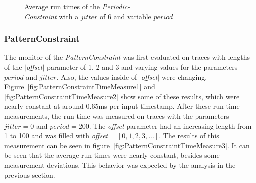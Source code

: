 \begin{figure}
\begin{minipage}{0.45\textwidth}
		\centering
		\caption{Average run times of the \textit{Periodic-\\Constraint} with a $jitter$ of 6 and variable $period$}
		\label{fig:PeriodicConstrainttRunTime2}
	\end{minipage}
\end{figure}



\subsubsection{PatternConstraint}
	The monitor of the \emph{PatternConstraint} was first evaluated on traces with lengths of the $|$\textit{offset}$|$ parameter of 1, 2 and 3 and varying values for the parameters $period$ and $jitter$. Also, the values inside of $|$\textit{offset}$|$ were changing. Figure~\ref{fig:PatternConstraintTimeMeasure1} and \ref{fig:PatternConstraintTimeMeasure2} show some of these results, which were nearly constant at around 0.65ms per input timestamp. After these run time measurements, the run time was measured on traces with the parameters $jitter=0$ and $period=200$. The \textit{offset} parameter had an increasing length from 1 to 100 and was filled with \textit{offset}$=[0, 1, 2, 3, ...]$. The results of this measurement can be seen in figure~\ref{fig:PatternConstraintTimeMeasure3}. It can be seen that the average run times were nearly constant, besides some measurement deviations. This behavior was expected by the analysis in the previous section.
	
